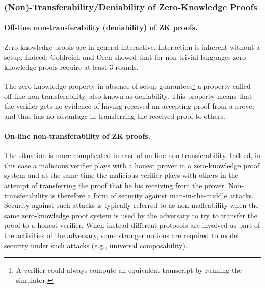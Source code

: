 \subsubsection{(Non)-Transferability/Deniability of Zero-Knowledge Proofs}  %

\paragraph{Off-line non-transferability (deniability) of ZK proofs.}
Zero-knowledge proofs are in general interactive. 
Interaction is inherent without a setup. Indeed, Goldreich and Oren showed that for non-trivial languages zero-knowledge proofs require at least 3 rounds. 

The zero-knowledge property in absence of setup guarantees\footnote{A verifier could always compute an equivalent transcript by running the simulator.}
a property called off-line non-transferability, also known as deniability. 
This property means that the verifier gets no evidence of having received an accepting proof from a prover and thus has no advantage in transferring the received proof to others.


\paragraph{On-line non-transferability of ZK proofs.}
The situation is more complicated in case of on-line non-transferability.
Indeed, in this case a malicious verifier plays with a honest prover in a zero-knowledge proof system and at the same time the malicious verifier plays with others in the attempt of transferring the proof that he his receiving from the prover. 
Non-transferability is therefore a form of security against man-in-the-middle attacks. 
Security against such attacks is typically referred to as non-malleability when the same zero-knowledge proof system is used by the adversary to try to transfer the proof to a honest verifier. 
When instead different protocols are involved as part of the activities of the adversary, some stronger notions are required to model security under such attacks (e.g., universal composability).


